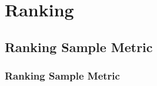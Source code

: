 \chapter{Ranking}


\clearpage
\thispagestyle{rankingstyle}
\section{Ranking Sample Metric}
\subsection{Ranking Sample Metric}